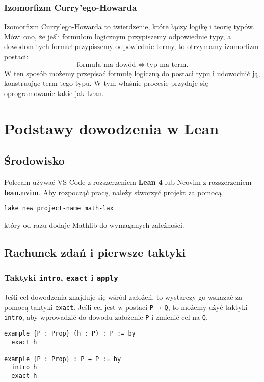 \documentclass[polish,pretty]{angav}
\newcommand{\Lean}[1]{\texttt{#1}}
\begin{document}
\subsubsection*{Izomorfizm Curry'ego-Howarda}

Izomorfizm Curry'ego-Howarda to twierdzenie, które łączy logikę i teorię typów.
Mówi ono, że jeśli formułom logicznym przypiszemy odpowiednie typy, a dowodom tych formuł przypiszemy odpowiednie termy, to otrzymamy izomorfizm postaci:
\[ \text{formuła ma dowód} \iff \text{typ ma term}. \]
W ten sposób możemy przepisać formułę logiczną do postaci typu i udowodnić ją, konstruując term tego typu.
W tym właśnie procesie przydaje się oprogramowanie takie jak Lean.


\section{Podstawy dowodzenia w Lean}

\subsection{Środowisko}

Polecam używać VS Code z rozszerzeniem \textbf{Lean 4} lub Neovim z rozszerzeniem \textbf{lean.nvim}.
Aby rozpocząć pracę, należy stworzyć projekt za pomocą
\begin{verbatim}
lake new project-name math-lax
\end{verbatim}
który od razu dodaje Mathlib do wymaganych zależności.


\subsection{Rachunek zdań i pierwsze taktyki}

\subsubsection*{Taktyki \texttt{intro}, \texttt{exact} i \texttt{apply}}

Jeśli cel dowodzenia znajduje się wśród założeń, to wystarczy go wskazać za pomocą taktyki \Lean{exact}. Jeśli cel jest w postaci \Lean{P → Q}, to możemy użyć taktyki \Lean{intro}, aby wprowadzić do dowodu założenie \Lean{P} i zmienić cel na \Lean{Q}.
\begin{verbatim}
example {P : Prop} (h : P) : P := by
  exact h

example {P : Prop} : P → P := by
  intro h
  exact h
\end{verbatim}
\end{document}

